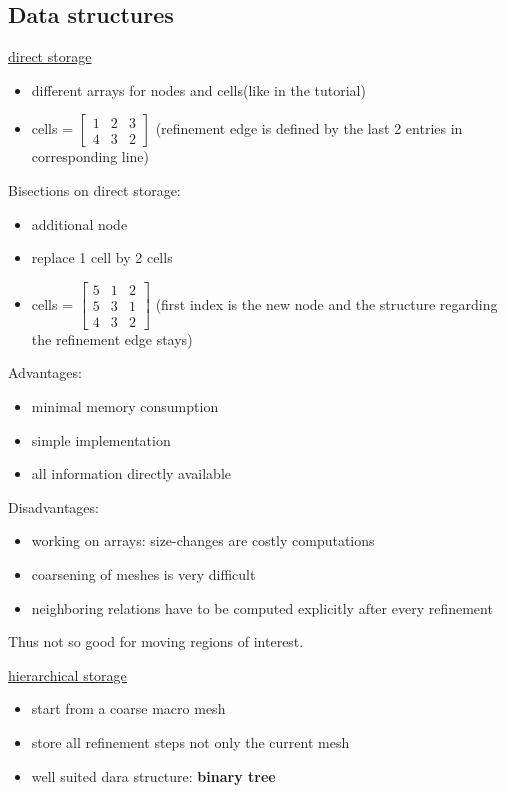 \subsection{Data structures}
\underline{direct storage}
\begin{itemize}
	\item different arrays for nodes and cells(like in the tutorial)
	
	\item cells = 
	$\begin{bmatrix}
		1 & 2 & 3\\
		4 & 3 & 2
	\end{bmatrix} $ (refinement edge is defined by the last 2 entries in corresponding line)
	
\end{itemize}
Bisections on direct storage:
\begin{itemize}
	\item additional node
	\item replace 1 cell by 2 cells
	
	\item cells = 
	$\begin{bmatrix}
	5 & 1 & 2\\
	5 & 3 & 1\\
	4 & 3 & 2
	\end{bmatrix} $ (first index is the new node and the structure regarding the refinement edge stays)
	
\end{itemize}

Advantages:
\begin{itemize}
	\item minimal memory consumption
	\item simple implementation
	\item all information directly available
\end{itemize}

Disadvantages:
\begin{itemize}
	\item working on arrays: size-changes are costly computations
	\item coarsening of meshes is very difficult
	\item neighboring relations have to be computed explicitly after every refinement
\end{itemize}
Thus not so good for moving regions of interest.
\vspace{1cm}

\underline{hierarchical storage}
\begin{itemize}
	\item start from a coarse \glqq macro mesh \grqq
	\item store all refinement steps not only the current mesh
	\item well suited dara structure: \textbf{binary tree}
\end{itemize}

